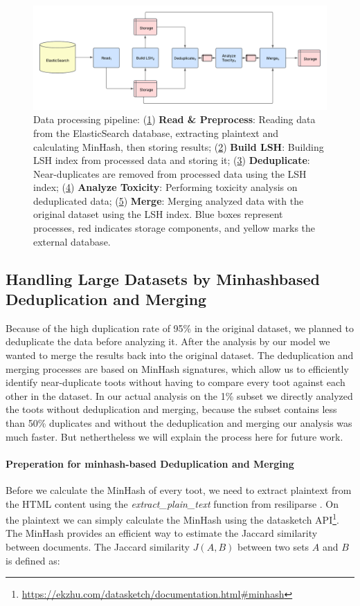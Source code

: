 \begin{figure}[tb]
    \centering
    \includegraphics[width=\textwidth]{../material/pipeline.png}
    \caption{Data processing pipeline: 
    (\hyperref[step:reading]{1}) \textbf{Read \& Preprocess}: Reading data from the ElasticSearch database, extracting plaintext and calculating MinHash, then storing results; 
    (\hyperref[step:lsh]{2}) \textbf{Build LSH}: Building LSH index from processed data and storing it; 
    (\hyperref[step:dedup]{3}) \textbf{Deduplicate}: Near-duplicates are removed from processed data using the LSH index; 
    (\hyperref[step:toxicity]{4}) \textbf{Analyze Toxicity}: Performing toxicity analysis on deduplicated data; 
    (\hyperref[step:merge]{5}) \textbf{Merge}: Merging analyzed data with the original dataset using the LSH index. 
    Blue boxes represent processes, red indicates storage components, and yellow marks the external database.}
    \label{fig:pipeline}
\end{figure}

\subsection{Handling Large Datasets by Minhashbased Deduplication and Merging}
Because of the high duplication rate of 95\% in the original dataset, we planned to deduplicate the data before analyzing it. After the analysis by our model we wanted to merge the results back into the original dataset. The deduplication and merging processes are based on MinHash signatures, which allow us to efficiently identify near-duplicate toots without having to compare every toot against each other in the dataset. In our actual analysis on the 1\% subset we directly analyzed the toots without deduplication and merging, because the subset contains less than 50\% duplicates and without the deduplication and merging our analysis was much faster. But nethertheless we will explain the process here for future work.

\paragraph{Preperation for minhash-based Deduplication and Merging} 
Before we calculate the MinHash of every toot, we need to extract plaintext from the HTML content using the \textit{extract\_plain\_text} function from resiliparse \cite{bevendorff:2018}. On the plaintext we can simply calculate the MinHash using the datasketch API\footnote{\url{https://ekzhu.com/datasketch/documentation.html\#minhash}}. The MinHash provides an efficient way to estimate the Jaccard similarity between documents. The Jaccard similarity $J(A,B)$ between two sets $A$ and $B$ is defined as:

